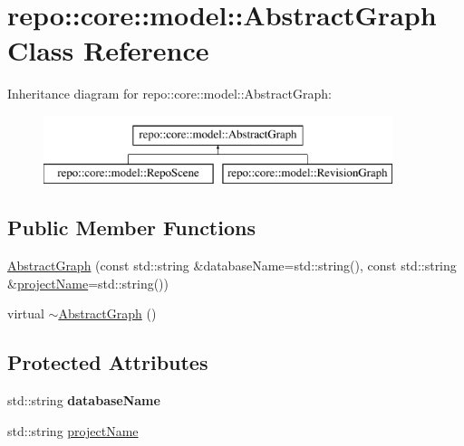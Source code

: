 \hypertarget{classrepo_1_1core_1_1model_1_1_abstract_graph}{}\section{repo\+:\+:core\+:\+:model\+:\+:Abstract\+Graph Class Reference}
\label{classrepo_1_1core_1_1model_1_1_abstract_graph}
Inheritance diagram for repo\+:\+:core\+:\+:model\+:\+:Abstract\+Graph\+:\begin{figure}[H]
\begin{center}
\leavevmode
\includegraphics[height=2.000000cm]{classrepo_1_1core_1_1model_1_1_abstract_graph}
\end{center}
\end{figure}
\subsection*{Public Member Functions}
\begin{DoxyCompactItemize}
\item 
\hyperlink{classrepo_1_1core_1_1model_1_1_abstract_graph_ae2f85bcaf763abcaee115635b6e2af34}{Abstract\+Graph} (const std\+::string \&database\+Name=std\+::string(), const std\+::string \&\hyperlink{classrepo_1_1core_1_1model_1_1_abstract_graph_a8d6f646d8c8d0e5c14b31bbff17a1f1d}{project\+Name}=std\+::string())
\item 
virtual \hyperlink{classrepo_1_1core_1_1model_1_1_abstract_graph_a468a9dd5783926675495c2d5493fef32}{$\sim$\+Abstract\+Graph} ()
\end{DoxyCompactItemize}
\subsection*{Protected Attributes}
\begin{DoxyCompactItemize}
\item 
\hypertarget{classrepo_1_1core_1_1model_1_1_abstract_graph_a714110ab1bbe9bdf360fb475ccb60ef7}{}std\+::string {\bfseries database\+Name}\label{classrepo_1_1core_1_1model_1_1_abstract_graph_a714110ab1bbe9bdf360fb475ccb60ef7}

\item 
std\+::string \hyperlink{classrepo_1_1core_1_1model_1_1_abstract_graph_a8d6f646d8c8d0e5c14b31bbff17a1f1d}{project\+Name}
\end{DoxyCompactItemize}


